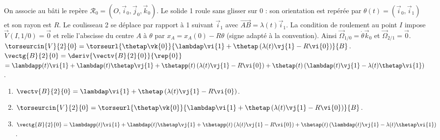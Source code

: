 \begin{corrigebox}
On associe au bâti le repère $\mathcal R_0=(O,\vec i_0,\vec j_0,\vec k_0)$.
            Le solide 1 roule sans glisser sur 0 : son orientation est repérée par
            $\theta(t)=(\vec i_0,\vec i_1)$ et son rayon est $R$. Le coulisseau 2 se
            déplace par rapport à 1 suivant $\vec i_1$ avec
            $\overrightarrow{AB}=\lambda(t)\vec i_1$. La condition de roulement au point
            $I$ impose $\vec V(I,1/0)=\vec0$ et relie l'abscisse du centre $A$ à
            $\theta$ par $x_A=x_A(0)-R\theta$ (signe adapté à la convention). Ainsi
            $\vec\Omega_{1/0}=\dot\theta\vec k_0$ et
            $\vec\Omega_{2/1}=\vec0$.
$\torseurcin{V}{2}{0}=\torseurl{\thetap \vk{0}}{ \lambdap\vi{1} + \thetap\left(\lambda(t)\vj{1}-R\vi{0} \right)}{B}$.
$\vectg{B}{2}{0} = \deriv{\vectv{B}{2}{0}}{\rep{0}}$
$ = \lambdapp(t)\vi{1} +\lambdap(t)\thetap\vj{1} 
+ \thetapp(t)\left(\lambda(t)\vj{1}-R\vi{0} \right)
+ \thetap(t)\left(\lambdap(t)\vj{1}-\lambda(t)\thetap\vi{1} \right)
$.

\begin{enumerate}
\item $\vectv{B}{2}{0} = \lambdap\vi{1} + \thetap\left(\lambda(t)\vj{1}-R\vi{0} \right)$.
\item $\torseurcin{V}{2}{0}=\torseurl{\thetap \vk{0}}{ \lambdap\vi{1} + \thetap\left(\lambda(t)\vj{1}-R\vi{0} \right)}{B}$.
\item $\vectg{B}{2}{0}  = \lambdapp(t)\vi{1} +\lambdap(t)\thetap\vj{1} 
+ \thetapp(t)\left(\lambda(t)\vj{1}-R\vi{0} \right)
+ \thetap(t)\left(\lambdap(t)\vj{1}-\lambda(t)\thetap\vi{1} \right)
$.
\end{enumerate}
\end{corrigebox}
